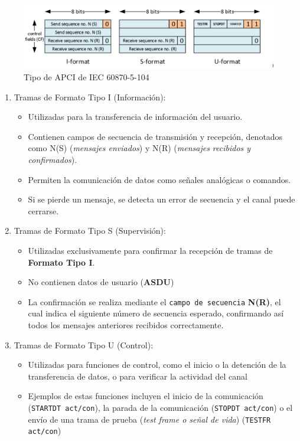 \documentclass[a5paper]{book}%
\begin{document}
\begin{figure}[H]
	\centering
	\caption{Tipo de APCI de IEC 60870-5-104}
	\label{fig:tramas104}
	\includegraphics[width=0.7\linewidth]{tramas_104_}
\end{figure}
  

\begin{enumerate}
\item Tramas de Formato Tipo I (Información):
  \begin{itemize}
  \item Utilizadas para la transferencia de información del usuario.
  \item Contienen campos de secuencia de transmisión y recepción, denotados como N(S) (\textit{mensajes enviados}) y N(R) (\textit{mensajes recibidos y confirmados}).
  \item Permiten la comunicación de datos como señales analógicas o comandos.
  \item Si se pierde un mensaje, se detecta un error de secuencia y el canal puede cerrarse.
    \end{itemize}

\item Tramas de Formato Tipo S (Supervisión):
\begin{itemize}
\item Utilizadas exclusivamente para confirmar la recepción de tramas de \textbf{Formato Tipo I}.
\item No contienen datos de usuario (\textbf{ASDU})
\item La confirmación se realiza mediante el \texttt{campo de secuencia} \textbf{N(R)}, el cual indica el siguiente número de secuencia esperado, confirmando así todos los mensajes anteriores recibidos correctamente.
\end{itemize}

\item Tramas de Formato Tipo U (Control):
  \begin{itemize}
  \item Utilizadas para funciones de control, como el inicio o la detención de la transferencia de datos, o para verificar la actividad del canal
  \item Ejemplos de estas funciones incluyen el inicio de la comunicación (\texttt{STARTDT act/con}), la parada de la comunicación (\texttt{STOPDT act/con}) o el envío de una trama de prueba (\textit{test frame o señal de vida}) (\texttt{TESTFR act/con})
  \end{itemize}
  
\end{enumerate}
\end{document}
